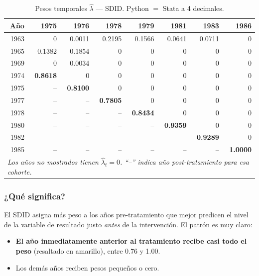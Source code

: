 \documentclass[11pt, a4paper]{article}
\begin{document}
\begin{table}[H]
\centering
\caption{Pesos temporales $\hat{\lambda}$ --- SDID. Python $=$ Stata a 4 decimales.}
\small
\begin{tabular}{rrrrrrrr}
\toprule
Año & 1975 & 1976 & 1978 & 1979 & 1981 & 1983 & 1986 \\
\midrule
1963 & 0       & 0.0011 & 0.2195 & 0.1566 & 0.0641 & 0.0711 & 0      \\
1965 & 0.1382  & 0.1854 & 0      & 0      & 0      & 0      & 0      \\
1969 & 0       & 0.0034 & 0      & 0      & 0      & 0      & 0      \\
1974 & \cellcolor{highlight}\textbf{0.8618}  & 0      & 0      & 0      & 0      & 0      & 0      \\
1975 & --      & \cellcolor{highlight}\textbf{0.8100} & 0      & 0      & 0      & 0      & 0      \\
1977 & --      & --     & \cellcolor{highlight}\textbf{0.7805} & 0      & 0      & 0      & 0      \\
1978 & --      & --     & --     & \cellcolor{highlight}\textbf{0.8434} & 0      & 0      & 0      \\
1980 & --      & --     & --     & --     & \cellcolor{highlight}\textbf{0.9359} & 0      & 0      \\
1982 & --      & --     & --     & --     & --     & \cellcolor{highlight}\textbf{0.9289} & 0      \\
1985 & --      & --     & --     & --     & --     & --     & \cellcolor{highlight}\textbf{1.0000} \\
\midrule
\multicolumn{8}{l}{\textit{Los años no mostrados tienen $\hat{\lambda}_t = 0$.
``--'' indica año post-tratamiento para esa cohorte.}} \\
\bottomrule
\end{tabular}
\end{table}

\subsubsection*{¿Qué significa?}

El SDID asigna más peso a los años pre-tratamiento que mejor predicen el nivel
de la variable de resultado justo \textit{antes} de la intervención. El patrón
es muy claro:

\begin{itemize}
  \item \textbf{El año inmediatamente anterior al tratamiento recibe casi todo el peso}
    (resaltado en amarillo), entre 0.76 y 1.00.
  \item Los demás años reciben pesos pequeños o cero.
\end{itemize}
\end{document}
